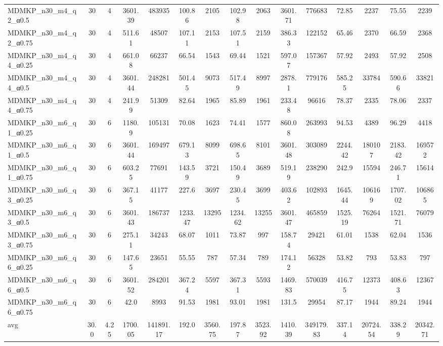 \begin{table}[!ht]
{\begin{tabular}{lcccccccccccccc}
MDMKP\_n30\_m4\_q2\_α0.5 & 30 & 4 & 3601.39 & 483935 & 100.86 & 2105 & 102.98 & 2063 & 3601.71 & 776683 & 72.85 & 2237 & 75.55 & 2239 \\
MDMKP\_n30\_m4\_q2\_α0.75 & 30 & 4 & 511.61 & 48507 & 107.11 & 2153 & 107.51 & 2159 & 386.33 & 122152 & 65.46 & 2370 & 66.59 & 2368 \\
MDMKP\_n30\_m4\_q4\_α0.25 & 30 & 4 & 661.08 & 66237 & 66.54 & 1543 & 69.44 & 1521 & 597.07 & 157367 & 57.92 & 2493 & 57.92 & 2508 \\
MDMKP\_n30\_m4\_q4\_α0.5 & 30 & 4 & 3601.44 & 248281 & 501.45 & 9073 & 517.49 & 8997 & 2878.1 & 779176 & 585.25 & 33784 & 590.66 & 33821 \\
MDMKP\_n30\_m4\_q4\_α0.75 & 30 & 4 & 241.99 & 51309 & 82.64 & 1965 & 85.89 & 1961 & 233.48 & 96616 & 78.37 & 2335 & 78.06 & 2337 \\
MDMKP\_n30\_m6\_q1\_α0.25 & 30 & 6 & 1180.9 & 105131 & 70.08 & 1623 & 74.41 & 1577 & 860.08 & 263993 & 94.53 & 4389 & 96.29 & 4418 \\
MDMKP\_n30\_m6\_q1\_α0.5 & 30 & 6 & 3601.44 & 169497 & 679.13 & 8099 & 698.65 & 8101 & 3601.48 & 303089 & 2244.42 & 180107 & 2183.42 & 169572 \\
MDMKP\_n30\_m6\_q1\_α0.75 & 30 & 6 & 603.25 & 77691 & 143.59 & 3721 & 150.49 & 3689 & 519.19 & 238290 & 242.9 & 15594 & 246.71 & 15614 \\
MDMKP\_n30\_m6\_q3\_α0.25 & 30 & 6 & 367.15 & 41177 & 227.6 & 3697 & 230.45 & 3699 & 403.62 & 102893 & 1645.44 & 106169 & 1707.02 & 106865 \\
MDMKP\_n30\_m6\_q3\_α0.5 & 30 & 6 & 3601.43 & 186737 & 1233.47 & 13295 & 1234.62 & 13255 & 3601.47 & 465859 & 1525.19 & 76264 & 1521.71 & 76079 \\
MDMKP\_n30\_m6\_q3\_α0.75 & 30 & 6 & 275.11 & 34243 & 68.07 & 1011 & 73.87 & 997 & 158.74 & 29421 & 61.01 & 1538 & 62.04 & 1536 \\
MDMKP\_n30\_m6\_q6\_α0.25 & 30 & 6 & 147.65 & 23651 & 55.55 & 787 & 57.34 & 789 & 174.12 & 56328 & 53.82 & 793 & 53.83 & 797 \\
MDMKP\_n30\_m6\_q6\_α0.5 & 30 & 6 & 3601.52 & 284201 & 367.24 & 5597 & 367.31 & 5593 & 1469.83 & 570039 & 416.75 & 12373 & 408.63 & 12367 \\
MDMKP\_n30\_m6\_q6\_α0.75 & 30 & 6 & 42.0 & 8993 & 91.53 & 1981 & 93.01 & 1981 & 131.5 & 29954 & 87.17 & 1944 & 89.24 & 1944 \\
\hline avg & 30.0 & 4.25 & 1700.05& 141891.17 & 192.0& 3560.75 & 197.87& 3523.92 & 1410.39& 349179.83 & 337.14& 20724.54 & 338.29& 20342.71\\ \hline

\end{tabular}}
\end{table}
